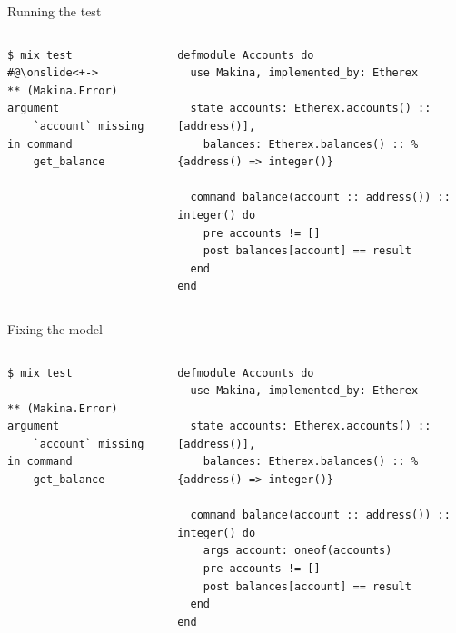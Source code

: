 \documentclass[aspectratio=169, 10pt, handout]{beamer}
\begin{document}
\begin{frame}[label={sec:org5809e5c},fragile]{Running the test}
 \begin{columns}
\begin{column}{0.28\columnwidth}
\onslide<+->
\lstset{language=bash,label= ,caption= ,captionpos=b,numbers=none,style=shell}
\begin{lstlisting}
$ mix test
#@\onslide<+->
** (Makina.Error) argument
    `account` missing in command
    get_balance
\end{lstlisting}
\vspace{40pt}
\end{column}

\begin{column}{0.58\columnwidth}
\lstset{language=elixir,label= ,caption= ,captionpos=b,numbers=none,style=display}
\begin{lstlisting}
defmodule Accounts do
  use Makina, implemented_by: Etherex

  state accounts: Etherex.accounts() :: [address()],
	balances: Etherex.balances() :: %{address() => integer()}

  command balance(account :: address()) :: integer() do
    pre accounts != []
    post balances[account] == result
  end
end
\end{lstlisting}
\end{column}
\end{columns}
\end{frame}

\begin{frame}[label={sec:org1de2016},fragile]{Fixing the model}
 \begin{columns}
\begin{column}{0.28\columnwidth}
\onslide<+->
\lstset{language=bash,label= ,caption= ,captionpos=b,numbers=none,style=shell}
\begin{lstlisting}
$ mix test

** (Makina.Error) argument
    `account` missing in command
    get_balance
\end{lstlisting}
\vspace{40pt}
\end{column}

\begin{column}{0.58\columnwidth}
\lstset{language=elixir,label= ,caption= ,captionpos=b,numbers=none,style=display}
\begin{lstlisting}
defmodule Accounts do
  use Makina, implemented_by: Etherex

  state accounts: Etherex.accounts() :: [address()],
	balances: Etherex.balances() :: %{address() => integer()}

  command balance(account :: address()) :: integer() do
    args account: oneof(accounts)
    pre accounts != []
    post balances[account] == result
  end
end
\end{lstlisting}
\end{column}
\end{columns}
\end{frame}
\end{document}
